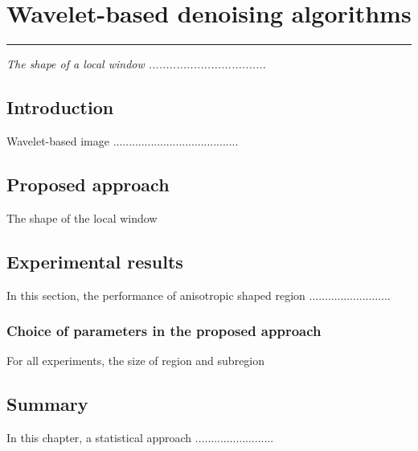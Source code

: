 \chapter{Wavelet-based denoising algorithms}
\label{C5} %
\graphicspath{{Figures/Chapter-5figs/PDF/}{Figures/Chapter-5figs/}}
\noindent\rule{\linewidth}{2pt}
\textit{The shape of a local window ..................................}
\section{Introduction} \label{S5.1}
Wavelet-based image \cite{gonzalez2002digital}........................................
\section{Proposed approach} \label{S5.3}
The shape of the local window 
\section{Experimental results} \label{S5.4}
In this section, the performance of anisotropic shaped region ..........................
\subsection{Choice of parameters in the proposed approach} \label{SS5.4.1}
For all experiments, the size of region and subregion 
\section{Summary}
In this chapter, a statistical approach .........................
 